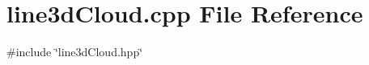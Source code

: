 \section{line3d\+Cloud.\+cpp File Reference}
\label{line3d_cloud_8cpp}
{\ttfamily \#include \char`\"{}line3d\+Cloud.\+hpp\char`\"{}}\newline
